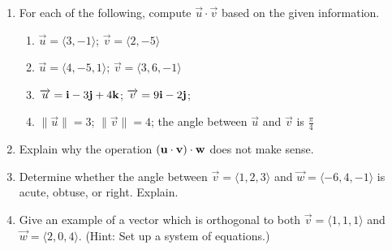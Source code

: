 \documentclass[12pt]{article}
\newif\ifans
\begin{document}
\begin{enumerate}

\item For each of the following, compute $\overrightarrow{u}\cdot\overrightarrow{v}$ based on the given information.

\begin{enumerate}

\item $\overrightarrow{u}=\langle 3,-1 \rangle$; $\overrightarrow{v}=\langle 2,-5 \rangle$

\ifans{\fbox{11}} \fi

\item $\overrightarrow{u}=\langle 4,-5,1 \rangle$; $\overrightarrow{v}=\langle 3,6,-1 \rangle$

\ifans{\fbox{$-19$}} \fi

\item $\overrightarrow{u}={\bf i}-3{\bf j}+4{\bf k}$; $\overrightarrow{v}=9{\bf i}-2{\bf j}$;

\ifans{\fbox{$15$}} \fi

\item $\|\overrightarrow{u}\|=3$; $\|\overrightarrow{v}\|=4$; the angle between $\overrightarrow{u}$ and $\overrightarrow{v}$ is $\frac{\pi}{4}$

\ifans{\fbox{$6\sqrt{2}$}} \fi

\end{enumerate}

\item Explain why the operation $({\bf u}\cdot{\bf v})\cdot{\bf w}$ does not make sense.

\ifans{\fbox{${\bf u}\cdot {\bf v}$ is a scalar.  We cannot take the dot product of a scalar with a vector.}} \fi

\item Determine whether the angle between $\overrightarrow{v}=\langle 1,2,3 \rangle$ and $\overrightarrow{w}=\langle -6,4,-1\rangle$ is acute, obtuse, or right.  Explain.

\ifans{\fbox{Since $\overrightarrow{v}\cdot\overrightarrow{w}=-1<0$, the angle between the two vectors is obtuse.}} \fi

\item Give an example of a vector which is orthogonal to both $\overrightarrow{v}=\langle 1,1,1\rangle$ and $\overrightarrow{w}=\langle 2,0,4 \rangle$.  (Hint: Set up a system of equations.)

\ifans{\fbox{Any scalar multiple of $\overrightarrow{n}=\langle -2,1,1 \rangle$ is orthogonal to both given vectors.}} \fi


\end{enumerate}
\end{document}
